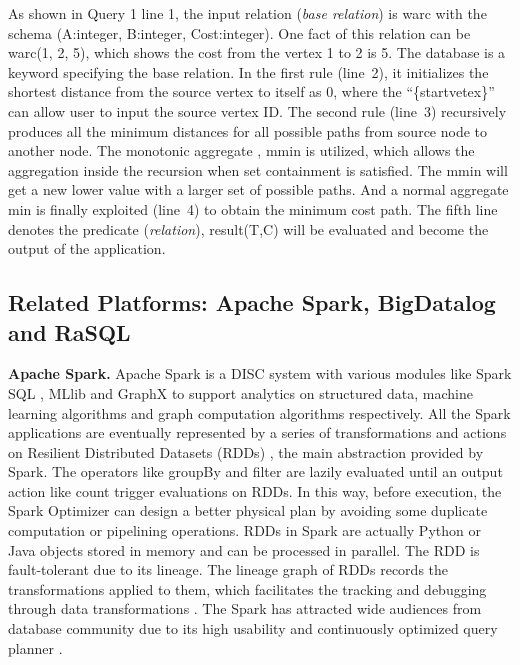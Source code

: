 As shown in Query 1 line 1, the input relation (\textit{base relation}) is \textsf{warc} with the schema \textsf{(A:integer, B:integer, Cost:integer)}. 
One fact of this relation can be \textsf{warc(1, 2, 5)}, which shows the  cost from   the vertex 1 to 2 is 5. The \textsf{database} is a keyword specifying the base relation.
In the first rule (line~2), it initializes the shortest distance from the source vertex to itself as 0, where the ``\{startvetex\}'' can allow user to input the source vertex ID. The second rule (line~3) recursively produces all the minimum distances for all possible paths from source node to another node. The monotonic aggregate \citep{zaniolo2019monotonic,das2019bigdata}, \textsf{mmin} is utilized, which allows the aggregation inside the recursion when set containment is satisfied. The \textsf{mmin} will get a new lower value with a larger set of possible paths. And a normal aggregate \textsf{min} is finally exploited (line~4) to obtain the minimum cost path. The fifth line denotes the  predicate (\textit{relation}), \textsf{result(T,C)} will be evaluated and become the output of the application.

\subsection{Related Platforms: Apache Spark, BigDatalog and RaSQL}
\textbf{Apache Spark.} Apache Spark is a DISC system with various modules like Spark SQL \citep{sparksql},  MLlib \citep{meng2016mllib} and GraphX \citep{gonzalez2014graphx} to support analytics on structured data, machine learning algorithms and graph computation algorithms respectively.  All the Spark applications are eventually represented by a series of transformations and actions on Resilient Distributed Datasets (RDDs) \citep{dean2004mapreduce}, the main abstraction provided by Spark. The operators like groupBy and filter are lazily evaluated until an output action like count trigger evaluations on RDDs. In this way, before execution, the Spark Optimizer can design a better physical plan by avoiding some duplicate computation or pipelining operations. RDDs in Spark are actually Python or Java objects stored in memory and can be processed in parallel. %
The RDD is fault-tolerant due to its lineage. The lineage graph of RDDs records the transformations applied to them, which facilitates the tracking and debugging through data transformations \citep{gulzar2017automated,interlandi2018adding}.  The Spark has attracted wide audiences from database community due to its high usability \citep{armbrust2015scaling} and continuously optimized query planner \citep{li2018rios}.

